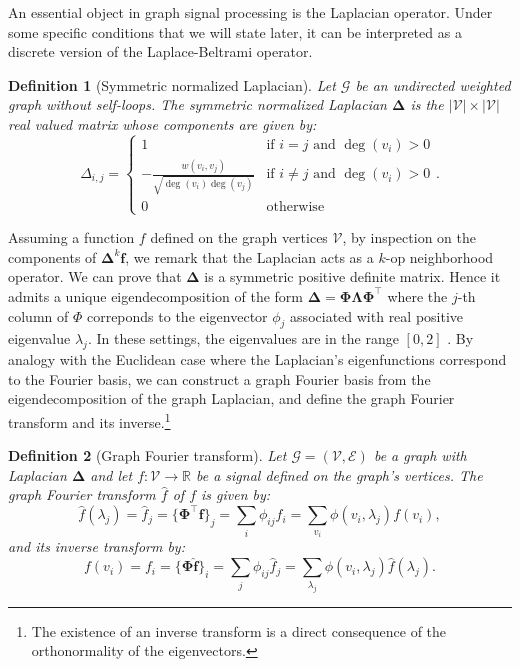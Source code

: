 \documentclass{article}
\newtheorem{definition}{Definition}[section]
\begin{document}
An essential object in graph signal processing is the Laplacian operator. Under some specific conditions that we will state later, it can be interpreted as a discrete version of the Laplace-Beltrami operator.
\begin{definition}[Symmetric normalized Laplacian] \label{def:graph_laplacian}
Let $\mathcal{G}$ be an undirected weighted graph without self-loops. The symmetric normalized Laplacian $\boldsymbol{\Delta}$ is the $|\mathcal{V}| \times |\mathcal{V}|$ real valued matrix whose components are given by:
\begin{equation}
\Delta_{i, j} =
\left\{
\begin{array}{ll}
1 & \text{if } i = j \text{ and } \deg(v_i) > 0 \\
- \frac{w(v_i, v_j)}{\sqrt{\deg (v_i) \deg (v_j)}} & \text{if } i \neq j \text{ and } \deg(v_i) > 0 \\ 
0 & \text{otherwise}
\end{array}
\right..
\end{equation}
\end{definition}

Assuming a function $f$ defined on the graph vertices $\mathcal{V}$, by inspection on the components of $\boldsymbol{\Delta}^k \boldsymbol{f}$, we remark that the Laplacian acts as a $k$-op neighborhood operator. We can prove that $\boldsymbol{\Delta}$ is a symmetric positive definite matrix. Hence it admits a unique eigendecomposition of the form $\boldsymbol{\Delta} = \boldsymbol{\Phi \Lambda \Phi}^\top$ where the $j$-th column of $\Phi$ correponds to the eigenvector $\phi_j$ associated with real positive eigenvalue $\lambda_j$. In these settings, the eigenvalues are in the range $[0, 2]$ \citep{chung1997spectral}. By analogy with the Euclidean case where the Laplacian's eigenfunctions correspond to the Fourier basis, we can construct a graph Fourier basis from the eigendecomposition of the graph Laplacian, and define the graph Fourier transform and its inverse.\footnote{The existence of an inverse transform is a direct consequence of the orthonormality of the eigenvectors.}
\begin{definition}[Graph Fourier transform]
Let $\mathcal{G} = (\mathcal{V}, \mathcal{E})$ be a graph with Laplacian $\boldsymbol{\Delta}$ and let $f : \mathcal{V} \to \mathbb{R}$ be a signal defined on the graph's vertices. The graph Fourier transform $\hat{f}$ of $f$ is given by:
\begin{equation}
\hat{f}(\lambda_j) = \hat{f}_j = \{ \boldsymbol{\Phi}^\top \boldsymbol{f}\}_j = \sum_i \phi_{ij} f_i = \sum_{v_i} \phi(v_i, \lambda_j) f(v_i),
\end{equation}
and its inverse transform by:
\begin{equation}
f(v_i) = f_i = \{\boldsymbol{\Phi}  \boldsymbol{\hat{f}} \}_i = \sum_j \phi_{ij} \hat{f}_j = \sum_{\lambda_j} \phi(v_i, \lambda_j) \hat{f}(\lambda_j).
\end{equation}
\end{definition}
\end{document}
